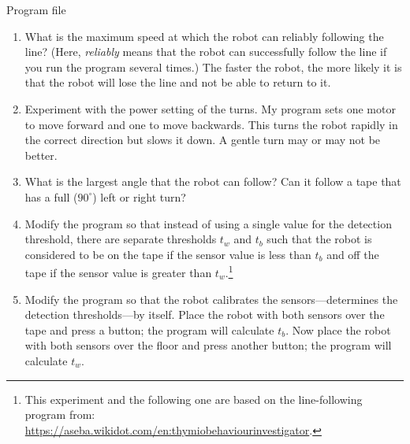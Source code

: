 {\raggedleft \hfill Program file }


\begin{enumerate}

\item What is the maximum speed at which the robot can reliably
following the line? (Here, \emph{reliably} means that the robot can
successfully follow the line if you run the program several times.) The
faster the robot, the more likely it is that the robot will lose the
line and not be able to return to it.

\item Experiment with the power setting of the turns. My program sets
one motor to move forward and one to move backwards. This turns the
robot rapidly in the correct direction but slows it down. A gentle turn
may or may not be better.

\item What is the largest angle that the robot can follow? Can it follow
a tape that has a full ($90^\circ$) left or right turn?

\item Modify the program so that instead of using a single value for the
detection threshold, there are separate thresholds $t_w$ and $t_b$ such
that the robot is considered to be on the tape if the sensor value is
less than $t_b$ and off the tape if the sensor value is greater than
$t_w$.\footnote{This experiment and the following one are based on the
 line-following program from:\\
\url{https://aseba.wikidot.com/en:thymiobehaviourinvestigator}.}

\item Modify the program so that the robot calibrates the
sensors---determines the detection thresholds---by itself. Place the
robot with both sensors over the tape and press a button; the program
will calculate $t_b$. Now place the robot with both sensors over the
floor and press another button; the program will calculate $t_w$.

\end{enumerate}
